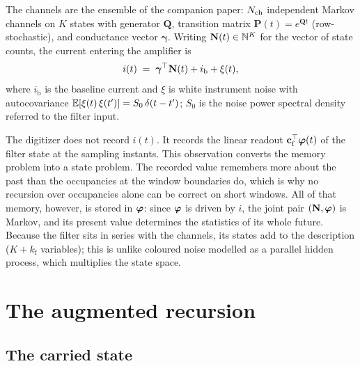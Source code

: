 \documentclass[11pt]{article}
\begin{document}
The channels are the ensemble of the companion paper: $N_{\mathrm{ch}}$ independent
Markov channels on $K$ states with generator $\mathbf{Q}$, transition
matrix $\mathbf{P}(t) = e^{\mathbf{Q}t}$ (row-stochastic), and conductance
vector $\bm{\gamma}$. Writing $\mathbf{N}(t) \in \mathbb{N}^K$ for the vector of
state counts, the current entering the amplifier is
\begin{equation}
  i(t) \;=\; \bm{\gamma}^{\top}\mathbf{N}(t) + i_{\mathrm{b}} + \xi(t),
  \label{eq:current}
\end{equation}
where $i_{\mathrm{b}}$ is the baseline current and $\xi$ is white
instrument noise with autocovariance
$\mathbb{E}[\xi(t)\,\xi(t')] = S_0\,\delta(t-t')$; $S_0$ is the noise power
spectral density referred to the filter input.

The digitizer does not record $i(t)$. It records the linear readout
$\mathbf{c}_{\mathrm{f}}^{\top}\bm{\varphi}(t)$ of the filter state at the sampling instants. This
observation converts the memory problem into a state problem. The recorded
value remembers more about the past than the occupancies at the window
boundaries do, which is why no recursion over occupancies alone can be
correct on short windows. All of that memory, however, is stored in $\bm{\varphi}$:
since $\bm{\varphi}$ is driven by $i$, the joint pair $(\mathbf{N},\bm{\varphi})$ is Markov, and its
present value determines the statistics of its whole future. Because the
filter sits in series with the channels, its states add to the description
($K + k_{\mathrm{f}}$ variables); this is unlike coloured noise modelled
as a parallel hidden process, which multiplies the state space.

\section{The augmented recursion}

\subsection{The carried state}
\end{document}

